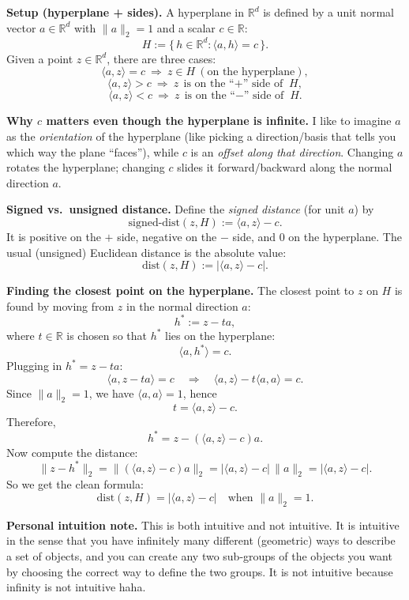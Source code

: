 \documentclass[10pt]{article}
\newcommand{\R}{\mathbb{R}}
\newcommand{\spara}[1]{\vspace{.5em}\noindent {\large\sffamily\textcolor{nyuOfficialPurple}{#1}}}
\begin{document}
\spara{1.1}

\textbf{Setup (hyperplane + sides).}
A hyperplane in $\R^d$ is defined by a unit normal vector $a\in\R^d$ with $\|a\|_2=1$ and a scalar $c\in\R$:
\[
H := \{\,h\in\R^d : \langle a,h\rangle = c\,\}.
\]
Given a point $z\in\R^d$, there are three cases:
\[
\langle a,z\rangle = c \ \Longrightarrow\  z\in H \ (\text{on the hyperplane}),
\]
\[
\langle a,z\rangle > c \ \Longrightarrow\  z \ \text{is on the ``$+$'' side of }H,
\]
\[
\langle a,z\rangle < c \ \Longrightarrow\  z \ \text{is on the ``$-$'' side of }H.
\]

\medskip
\textbf{Why $c$ matters even though the hyperplane is infinite.}
I like to imagine $a$ as the \emph{orientation} of the hyperplane (like picking a direction/basis that tells you which way the plane ``faces''), while $c$ is an \emph{offset along that direction}. Changing $a$ rotates the hyperplane; changing $c$ slides it forward/backward along the normal direction $a$.

\medskip
\textbf{Signed vs.\ unsigned distance.}
Define the \emph{signed distance} (for unit $a$) by
\[
\text{signed-dist}(z,H) := \langle a,z\rangle - c.
\]
It is positive on the $+$ side, negative on the $-$ side, and $0$ on the hyperplane. The usual (unsigned) Euclidean distance is the absolute value:
\[
\text{dist}(z,H) := |\langle a,z\rangle - c|.
\]

\medskip
\textbf{Finding the closest point on the hyperplane.}
The closest point to $z$ on $H$ is found by moving from $z$ in the normal direction $a$:
\[
h^* := z - t a,
\]
where $t\in\R$ is chosen so that $h^*$ lies on the hyperplane:
\[
\langle a,h^*\rangle = c.
\]
Plugging in $h^*=z-ta$:
\[
\langle a, z-ta\rangle = c
\quad\Longrightarrow\quad
\langle a,z\rangle - t\langle a,a\rangle = c.
\]
Since $\|a\|_2=1$, we have $\langle a,a\rangle=1$, hence
\[
t = \langle a,z\rangle - c.
\]
Therefore,
\[
h^* = z - (\langle a,z\rangle - c)a.
\]
Now compute the distance:
\[
\|z-h^*\|_2
=
\|(\langle a,z\rangle - c)a\|_2
=
|\langle a,z\rangle - c|\,\|a\|_2
=
|\langle a,z\rangle - c|.
\]
So we get the clean formula:
\[
\boxed{\text{dist}(z,H)=|\langle a,z\rangle - c| \quad \text{when }\|a\|_2=1.}
\]

\medskip
\textbf{Personal intuition note.}
This is both intuitive and not intuitive. It is intuitive in the sense that you have infinitely many different (geometric) ways to describe a set of objects, and you can create any two sub-groups of the objects you want by choosing the correct way to define the two groups. It is not intuitive because infinity is not intuitive haha.
\end{document}
